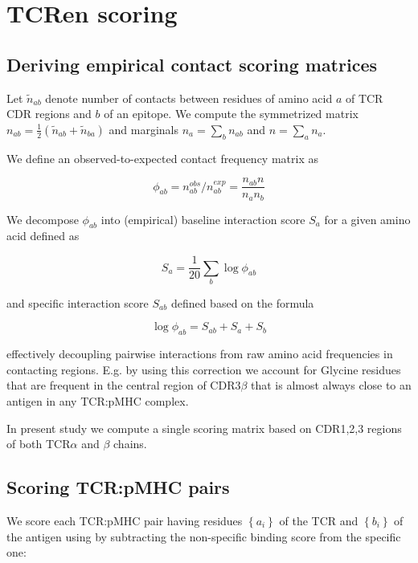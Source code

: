 \documentclass{article}
\begin{document}
\section{TCRen scoring}

\subsection{Deriving empirical contact scoring matrices} 

Let $\tilde{n}_{ab}$ denote number of contacts between residues of amino acid $a$ of TCR CDR regions and $b$ of an epitope. We compute the symmetrized matrix $n_{ab} = \frac{1}{2} \left(\tilde{n}_{ab} + \tilde{n}_{ba}\right)$ and marginals $n_a = \sum_{b} n_{ab}$ and $n = \sum_a n_{a}$.

We define an observed-to-expected contact frequency matrix as

\begin{equation}
\phi_{ab} = n^{obs}_{ab} /  n^{exp}_{ab} = \frac{n_{ab} n}{n_a n _b}
\end{equation}

We decompose $\phi_{ab}$ into (empirical) baseline interaction score $S_{a}$ for a given amino acid defined as

\begin{equation}
S_{a} = \frac{1}{20} \sum_{b} \log \phi_{ab}
\end{equation}

and specific interaction score $S_{ab}$ defined based on the formula

\begin{equation}
\log \phi_{ab}= S_{ab} + S_{a} + S_{b}
\end{equation}

effectively decoupling pairwise interactions from raw amino acid frequencies in contacting regions. E.g. by using this correction we account for Glycine residues that are frequent in the central region of CDR3$\beta$ that is almost always close to an antigen in any TCR:pMHC complex.

In present study we compute a single scoring matrix based on CDR1,2,3 regions of both TCR$\alpha$ and $\beta$ chains.

\subsection{Scoring TCR:pMHC pairs}

We score each TCR:pMHC pair having residues $\left\{a_i\right\}$ of the TCR and $\left\{b_i\right\}$ of the antigen using by subtracting the non-specific binding score from the specific one:
\end{document}
